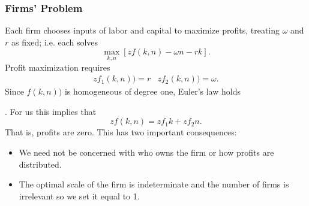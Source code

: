 \documentclass[aspectratio=169]{ltx-talk}
\begin{document}
\begin{frame}
\frametitle{Firms{'} Problem}
Each firm chooses inputs of labor and capital
to maximize profits, treating $\omega $ and $r$ as fixed; i.e. each solves%
\begin{equation*}
\underset{k,n}{\max }\left[ zf\left( k,n\right) -\omega n-rk\right] .
\end{equation*}%
Profit maximization requires 
\begin{equation*}
\begin{array}{ll}
zf_{1}\left( k,n\right) )=r & zf_{2}\left( k,n\right) )=\omega .%
\end{array}%
\end{equation*}%
Since $f\left( k,n\right) )$ is homogeneous of degree one, Euler's law holds%

\par{}
.
For us this implies that 
\begin{equation*}
zf(k,n)=zf_{1}k+zf_{2}n.
\end{equation*}%
That is, profits are zero. This has two important consequences:

\begin{itemize}
\item We need not be concerned with who owns the firm or how profits are
distributed.

\item The optimal scale of the firm is indeterminate and the number of firms
is irrelevant so we set it equal to 1.
\end{itemize}
\end{frame}
\end{document}
